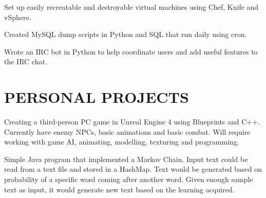 \documentclass[letterpaper]{deedy-resume-modified} %
\begin{document}
\begin{minipage}[t]{0.66\textwidth}
\sectionspace %



\begin{tightitemize}
\item Set up easily recreatable and destroyable virtual machines using Chef, Knife and vSphere.
\item Created MySQL dump scripts in Python and SQL that run daily using cron.
\item Wrote an IRC bot in Python to help coordinate users and add useful features to the IRC chat.
\end{tightitemize}

\sectionspace %


\section{PERSONAL PROJECTS}


Creating a third-person PC game in Unreal Engine 4 using Blueprints and C++.  Currently have enemy NPCs, basic animations and basic combat.  Will require working with game AI, animating, modelling, texturing and programming.  

\sectionspace %



Simple Java program that implemented a Markov Chain.  Input text could be read from a text file and stored in a HashMap.  Text would be generated based on probability of a specific word coming after another word.  Given enough sample text as input, it would generate new text based on the learning acquired.

\sectionspace %


\end{minipage}
\end{document}
